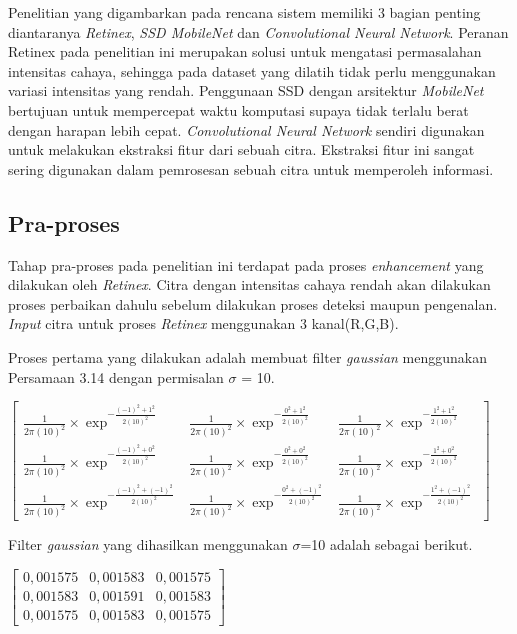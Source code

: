 Penelitian yang digambarkan pada rencana sistem memiliki 3 bagian penting diantaranya \emph{Retinex}, \emph{SSD MobileNet} dan \emph{Convolutional Neural Network}.
Peranan Retinex pada penelitian ini merupakan solusi untuk mengatasi permasalahan intensitas cahaya, sehingga pada dataset yang dilatih tidak perlu menggunakan variasi intensitas yang rendah. Penggunaan SSD dengan arsitektur \emph{MobileNet} bertujuan untuk mempercepat waktu komputasi supaya tidak terlalu berat dengan harapan lebih cepat. \emph{Convolutional Neural Network} sendiri digunakan untuk melakukan ekstraksi fitur dari sebuah citra. Ekstraksi fitur ini sangat sering digunakan dalam pemrosesan sebuah citra untuk memperoleh informasi. 
\subsection{Pra-proses}
Tahap pra-proses pada penelitian ini terdapat pada proses \emph{enhancement} yang dilakukan oleh \emph{Retinex}. Citra dengan intensitas cahaya rendah akan dilakukan proses perbaikan dahulu sebelum dilakukan proses deteksi maupun pengenalan. \emph{Input} citra untuk proses \emph{Retinex} menggunakan 3 kanal(R,G,B).

Proses pertama yang dilakukan adalah membuat filter \emph{gaussian} menggunakan Persamaan 3.14 dengan permisalan $\sigma$ = 10.

\noindent
$\left[
\begin{matrix}
	\frac{1}{2\pi(10)^2}\times \exp^{-\frac{(-1)^2+1^2}{2(10)^2}} & \frac{1}{2\pi(10)^2}\times \exp^{-\frac{0^2+1^2}{2(10)^2}} &\frac{1}{2\pi(10)^2}\times \exp^{-\frac{1^2+1^2}{2(10)^2}} \\
	\frac{1}{2\pi(10)^2}\times \exp^{-\frac{(-1)^2+0^2}{2(10)^2}} & \frac{1}{2\pi(10)^2}\times \exp^{-\frac{0^2+0^2}{2(10)^2}} &\frac{1}{2\pi(10)^2}\times \exp^{-\frac{1^2+0^2}{2(10)^2}} \\
	\frac{1}{2\pi(10)^2}\times \exp^{-\frac{(-1)^2+(-1)^2}{2(10)^2}} & \frac{1}{2\pi(10)^2}\times \exp^{-\frac{0^2+(-1)^2}{2(10)^2}} &\frac{1}{2\pi(10)^2}\times \exp^{-\frac{1^2+(-1)^2}{2(10)^2}} 	
\end{matrix}
\right]$

\noindent Filter \emph{gaussian} yang dihasilkan menggunakan $\sigma$=10 adalah sebagai berikut.

\noindent
$\left[
\begin{matrix}
	0,001575 & 0,001583 & 0,001575
	 \\
	0,001583 & 0,001591 & 0,001583
	\\
	0,001575 & 0,001583 & 0,001575
\end{matrix}
\right]$

